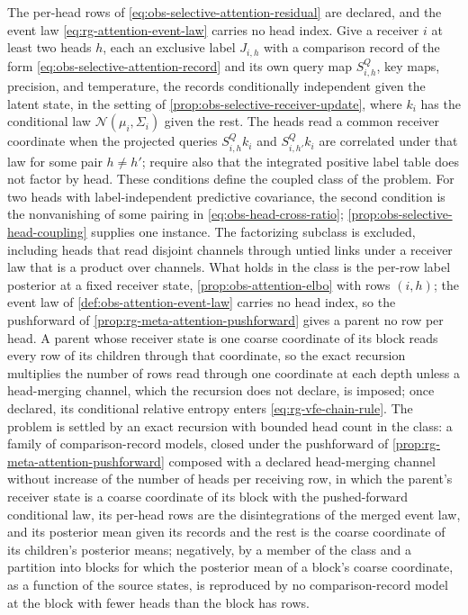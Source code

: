 The per-head rows of \eqref{eq:obs-selective-attention-residual} are declared,
and the event law \eqref{eq:rg-attention-event-law} carries no head index. Give
a receiver \(i\) at least two heads \(h\), each an exclusive label \(J_{i,h}\)
with a comparison record of the form \eqref{eq:obs-selective-attention-record}
and its own query map \(S^Q_{i,h}\), key maps, precision, and temperature, the
records conditionally independent given the latent state, in the setting of
\cref{prop:obs-selective-receiver-update}, where \(k_i\) has the conditional
law \(\mathcal N(\mu_i,\Sigma_i)\) given the rest. The heads read a common
receiver coordinate when the projected queries \(S^Q_{i,h}k_i\) and
\(S^Q_{i,h'}k_i\) are correlated under that law for some pair \(h\ne h'\);
require also that the integrated positive label table does not factor by
head. These conditions define the coupled class of the problem. For two
heads with label-independent predictive covariance, the second condition
is the nonvanishing of some pairing in
\cref{eq:obs-head-cross-ratio}; \cref{prop:obs-selective-head-coupling}
supplies one instance. The factorizing subclass is excluded, including
heads that read disjoint channels through untied links under a receiver law
that is a product over channels.
What holds in the class is the per-row label posterior at a fixed receiver
state, \cref{prop:obs-attention-elbo} with rows \((i,h)\); the event law of
\cref{def:obs-attention-event-law} carries no head index, so the pushforward
of \cref{prop:rg-meta-attention-pushforward} gives a parent no row per head.
A parent whose receiver state is one coarse coordinate of its block
reads every row of its children through that coordinate, so the exact
recursion multiplies the number of rows read through one coordinate at each
depth unless a head-merging channel, which the recursion does not declare, is
imposed; once declared, its conditional relative entropy enters
\eqref{eq:rg-vfe-chain-rule}. The problem is settled by an exact recursion
with bounded head count in the class: a family of comparison-record models,
closed under the pushforward of \cref{prop:rg-meta-attention-pushforward}
composed with a declared head-merging channel without increase of the number
of heads per receiving row, in which the parent's receiver state is a coarse
coordinate of its block with the pushed-forward conditional law, its per-head
rows are the disintegrations of the merged event law, and its posterior mean
given its records and the rest is the coarse coordinate of its children's
posterior means; negatively, by a member of the class and a partition into
blocks for which the posterior mean of a block's coarse coordinate, as a
function of the source states, is reproduced by no comparison-record model
at the block with fewer heads than the block has rows.

